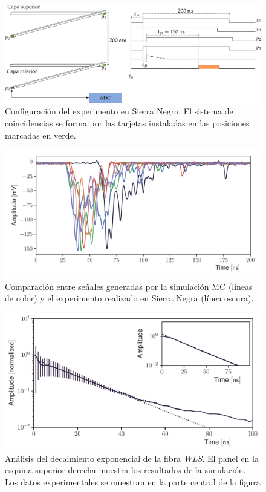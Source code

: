 \begin{figure}
        \centering
        \includegraphics[width=\textwidth]{muons-experiment.pdf}
        \caption{Configuración del experimento en Sierra Negra. El sistema de coincidencias se forma por las tarjetas instaladas en las posiciones marcadas en verde.}
        \label{fig:muons-experiment}
\end{figure}


\begin{figure}
        \centering
        \includegraphics[width=\textwidth]{muon-pulse.pdf}
        \caption{Comparación entre señales generadas por la simulación MC (líneas de color) y el experimento realizado en Sierra Negra (línea oscura).}
        \label{fig:muon-pulse}
\end{figure}

\begin{figure}
        \centering
        \includegraphics[width=\textwidth]{muons-tail-fit.pdf}
        \caption{Análisis del decaimiento exponencial de la fibra \emph{WLS}. El panel en la esquina superior derecha muestra los resultados de la simulación. Los datos experimentales se muestran en la parte central de la figura}
        \label{fig:muons-tail}
\end{figure}


